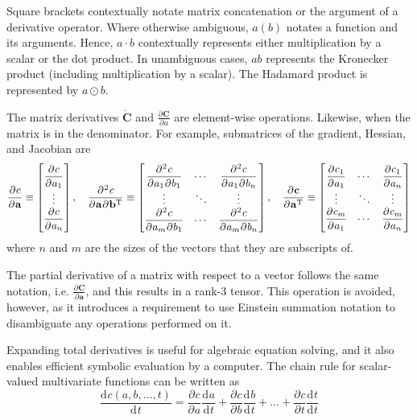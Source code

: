 \documentclass[11pt]{article}
\newcommand{\oD}[2]{
    \frac{\mathrm{d}\mspace{1mu}#1}{\mathrm{d}\mspace{1mu}#2}
}
\newcommand{\pD}[2]{
    \frac{\partial\mspace{1mu}#1}{\partial\mspace{1mu}#2}
}
\newcommand{\pDD}[3]{
    \frac{\partial{^{\mspace{1mu}2}}\mspace{1mu}#1}{\partial\mspace{1mu}#2\mspace{1mu}\partial\mspace{1mu}#3}
}
\begin{document}
Square brackets contextually notate matrix concatenation or the argument of a derivative operator. Where otherwise ambiguous, $a(b)$ notates a function and its arguments. Hence, $a \cdot b$ contextually represents either multiplication by a scalar or the dot product. In unambiguous cases, $ab$ represents the Kronecker product (including multiplication by a scalar). The Hadamard product is represented by $a \odot b$.

The matrix derivatives $\dot{\mathbf{C}}$ and $\pD{\mathbf{C}}{a}$ are element-wise operations. Likewise, when the matrix is in the denominator. For example, submatrices of the gradient, Hessian, and Jacobian are
\begin{equation}
\everymath{\displaystyle} %
    \pD{c}{\mathbf{a}}
    \equiv \begin{bmatrix}
        \pD{c}{a_1} \\
        \vdots  \\
        \pD{c}{a_n} \\
    \end{bmatrix}
    ,\quad
    \pDD{c}{\mathbf{a}}{\mathbf{b}^{\mathrm{T}}}
    \equiv \begin{bmatrix}
        \pDD{c}{a_1}{b_1} & \cdots & \pDD{c}{a_1}{b_n} \\
        \vdots & \ddots & \vdots  \\
        \pDD{c}{a_m}{b_1} & \cdots & \pDD{c}{a_m}{b_n}
    \end{bmatrix}
    ,\quad
    \pD{\mathbf{c}}{\mathbf{a}^{\mathrm{T}}}
    \equiv \begin{bmatrix}
        \pD{c_1}{a_1} & \cdots & \pD{c_1}{a_n} \\
        \vdots & \ddots & \vdots  \\
        \pD{c_m}{a_1} & \cdots & \pD{c_m}{a_n}
    \end{bmatrix}
\end{equation}
where $n$ and $m$ are the sizes of the vectors that they are subscripts of. 

The partial derivative of a matrix with respect to a vector follows the same notation, i.e. $\pD{\mathbf{C}}{\mathbf{a}}$, and this results in a rank-3 tensor. This operation is avoided, however, as it introduces a requirement to use Einstein summation notation to disambiguate any operations performed on it.

Expanding total derivatives is useful for algebraic equation solving, and it also enables efficient symbolic evaluation by a computer. The chain rule for scalar-valued multivariate functions can be written as
\begin{equation}
    \oD{c(a,b,\dots,t)}{t}
    = \pD{c}{a}\oD{a}{t} + \pD{c}{b}\oD{b}{t} + \dots + \pD{c}{t}\oD{t}{t}
\end{equation}
\end{document}
